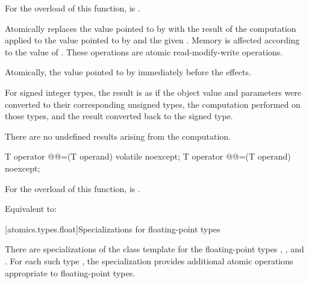 \begin{itemdescr}
\pnum
\constraints
For the  overload of this function,
 is .

\pnum
\effects
Atomically replaces the value pointed to by
 with the result of the computation applied to the
value pointed to by  and the given .
Memory is affected according to the value of .
These operations are atomic read-modify-write operations.

\pnum
\returns
Atomically, the value pointed to by  immediately before the effects.

\pnum
{}%
\remarks
For signed integer types,
the result is as if the object value and parameters
were converted to their corresponding unsigned types,
the computation performed on those types, and
the result converted back to the signed type.
\begin{note}
There are no undefined results arising from the computation.
\end{note}

\end{itemdescr}

%
%
%
%
%
%
%
\begin{itemdecl}
T operator @@=(T operand) volatile noexcept;
T operator @@=(T operand) noexcept;
\end{itemdecl}

\begin{itemdescr}
\pnum
\constraints
For the  overload of this function,
 is .

\pnum
\effects
Equivalent to: 
\end{itemdescr}

[atomics.types.float]{Specializations for floating-point types}

%
\pnum
There are specializations of the 
class template for the floating-point types
,
, and
.
For each such type ,
the specialization 
provides additional atomic operations appropriate to floating-point types.

